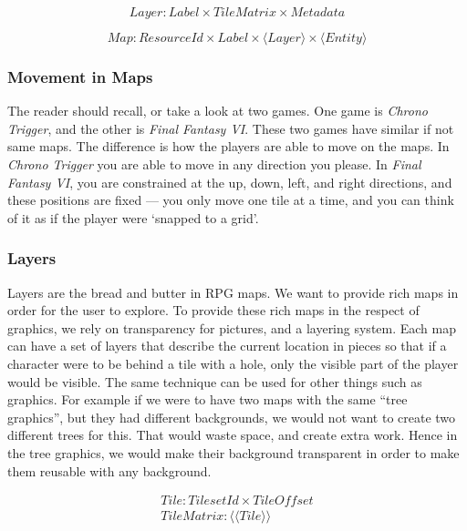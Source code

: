 \begin{equation}
Layer\colon Label \times TileMatrix \times Metadata
\end{equation}

\begin{equation}
Map\colon ResourceId \times Label \times \langle Layer \rangle \times \langle Entity \rangle
\end{equation}

\subsubsection{Movement in Maps}

The reader should recall, or take a look at two games. One game is
\textit{Chrono Trigger}, and the other is \textit{Final Fantasy VI}. These two
games have similar if not same maps. The difference is how the players are able
to move on the maps. In \textit{Chrono Trigger} you are able to move in any
direction you please. In \textit{Final Fantasy VI}, you are constrained at the
up, down, left, and right directions, and these positions are fixed --- you only
move one tile at a time, and you can think of it as if the player were `snapped
to a grid'.

\subsubsection{Layers}

Layers are the bread and butter in RPG maps. We want to provide rich maps in
order for the user to explore. To provide these rich maps in the respect of
graphics, we rely on transparency for pictures, and a layering system. Each
map can have a set of layers that describe the current location in pieces so
that if a character were to be behind a tile with a hole, only the visible part
of the player would be visible. The same technique can be used for other things
such as graphics. For example if we were to have two maps with the same ``tree
graphics'', but they had different backgrounds, we would not want to create two
different trees for this. That would waste space, and create extra work. Hence
in the tree graphics, we would make their background transparent in order to
make them reusable with any background.

\begin{equation}
\begin{split}
Tile\colon TilesetId \times TileOffset \\
TileMatrix\colon \langle \langle Tile \rangle \rangle
\end{split}
\end{equation}


